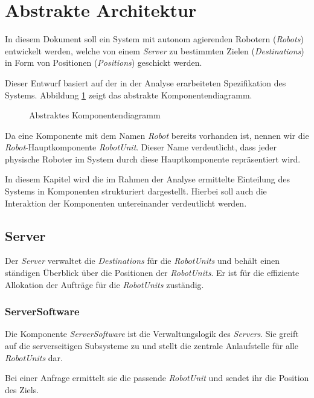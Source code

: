 \section{Abstrakte Architektur}
In diesem Dokument soll ein System mit autonom agierenden Robotern (\emph{Robots}) entwickelt werden, welche von einem \emph{Server} zu bestimmten Zielen (\emph{Destinations}) in Form von Positionen (\emph{Positions}) geschickt werden. 

Dieser Entwurf basiert auf der in der Analyse erarbeiteten Spezifikation des Systems. Abbildung \ref{KomponentendiagrammAbstrakt} zeigt das abstrakte Komponentendiagramm.

\begin{figure}[H]
\centering
\caption{Abstraktes Komponentendiagramm}
\label{KomponentendiagrammAbstrakt}
\end{figure}

Da eine Komponente mit dem Namen \emph{Robot} bereits vorhanden ist, nennen wir die \emph{Robot}-Hauptkomponente \emph{RobotUnit}. Dieser Name verdeutlicht, dass jeder physische Roboter im System durch diese Hauptkomponente repr\"{a}sentiert wird.


In diesem Kapitel wird die im Rahmen der Analyse ermittelte Einteilung des Systems in Komponenten strukturiert dargestellt. Hierbei soll auch die Interaktion der Komponenten untereinander verdeutlicht werden.

\subsection{Server}

Der \emph{Server} verwaltet die \emph{Destinations} f\"{u}r die \emph{RobotUnits} und beh\"{a}lt einen st\"{a}ndigen \"{U}berblick \"{u}ber die Positionen der \emph{RobotUnits}. Er ist f\"{u}r die effiziente Allokation der Auftr\"{a}ge f\"{u}r die \emph{RobotUnits} zust\"{a}ndig.

\subsubsection{ServerSoftware}

Die Komponente \emph{ServerSoftware} ist die Verwaltungslogik des \emph{Servers}. Sie greift auf die serverseitigen Subsysteme zu und stellt die zentrale Anlaufstelle f\"{u}r alle \emph{RobotUnits} dar. 

Bei einer Anfrage ermittelt sie die passende \emph{RobotUnit} und sendet ihr die Position des Ziels. 

